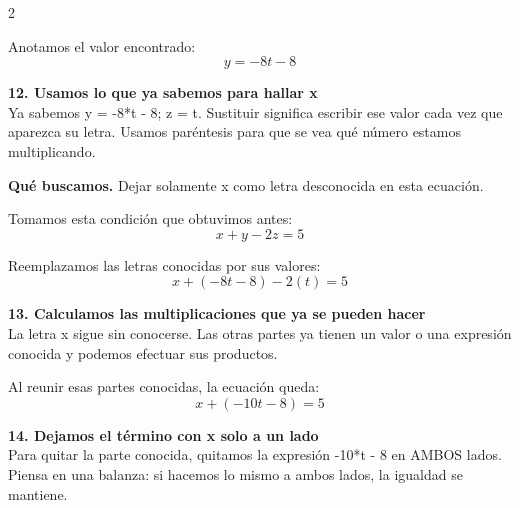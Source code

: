 \documentclass[11pt,a4paper,landscape]{article}
\begin{document}
\begin{multicols*}{2}
\begin{minipage}{\linewidth}
\par\smallskip Anotamos el valor encontrado:
\[y=- 8 t - 8\]
\end{minipage}\par\medskip
\noindent\begin{minipage}{\linewidth}\textbf{12. Usamos lo que ya sabemos para hallar x}\\[2pt]Ya sabemos y = -8*t - 8; z = t. Sustituir significa escribir ese valor cada vez que aparezca su letra. Usamos paréntesis para que se vea qué número estamos multiplicando.
\par\smallskip\textbf{Qué buscamos.} Dejar solamente x como letra desconocida en esta ecuación.
\par\smallskip Tomamos esta condición que obtuvimos antes:
\[x + y - 2z = 5\]
\par\smallskip Reemplazamos las letras conocidas por sus valores:
\[x + \left(- 8 t - 8\right) - 2\left(t\right)=5\]
\end{minipage}\par\medskip
\noindent\begin{minipage}{\linewidth}\textbf{13. Calculamos las multiplicaciones que ya se pueden hacer}\\[2pt]La letra x sigue sin conocerse. Las otras partes ya tienen un valor o una expresión conocida y podemos efectuar sus productos.
\par{}\par\smallskip
\par\smallskip Al reunir esas partes conocidas, la ecuación queda:
\[x + \left(- 10 t - 8\right)=5\]
\end{minipage}\par\medskip
\noindent\begin{minipage}{\linewidth}\textbf{14. Dejamos el término con x solo a un lado}\\[2pt]Para quitar la parte conocida, quitamos la expresión -10*t - 8 en AMBOS lados. Piensa en una balanza: si hacemos lo mismo a ambos lados, la igualdad se mantiene.

\end{minipage}
\end{multicols*}
\end{document}
